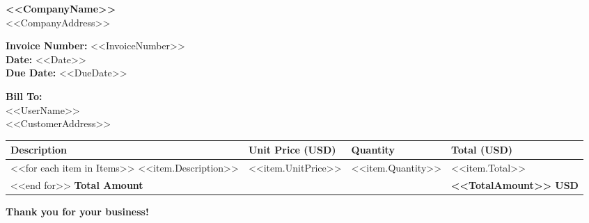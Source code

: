 \documentclass[12pt]{article}
\begin{document}
    \begin{flushright}
        \textbf{\textcolor{headercolor}{<<CompanyName>>}} \\
        \textcolor{headercolor}{<<CompanyAddress>>} \\
    \end{flushright}

    \begin{flushleft}
        \textbf{\textcolor{headercolor}{Invoice Number:}} <<InvoiceNumber>> \\
        \textbf{\textcolor{headercolor}{Date:}} <<Date>> \\
        \textbf{\textcolor{headercolor}{Due Date:}} <<DueDate>> \\
    \end{flushleft}

    \vspace{0.5cm}

    \begin{flushleft}
        \textbf{\textcolor{headercolor}{Bill To:}} \\
        <<UserName>> \\
        <<CustomerAddress>> \\
    \end{flushleft}

    \vspace{0.5cm}

    \begin{flushleft}
        \begin{tabularx}{\textwidth}{| >{\raggedright}X | >{\raggedleft}p{2.5cm} | >{\raggedleft}p{2.5cm} | >{\raggedleft\arraybackslash}p{3cm} |}
            \hline
            \textbf{Description} & \textbf{Unit Price (USD)} & \textbf{Quantity} & \textbf{Total (USD)} \\
            \hline
            <<for each item in Items>>  %
            <<item.Description>> & <<item.UnitPrice>> & <<item.Quantity>> & <<item.Total>> \\
            <<end for>>  %
            \hline
            \textbf{Total Amount} & & & \textbf{<<TotalAmount>> USD} \\
            \hline
        \end{tabularx}
    \end{flushleft}

    \vspace{1cm}

    \begin{flushright}
        \textcolor{headercolor}{\textbf{Thank you for your business!}}
    \end{flushright}
\end{document}
